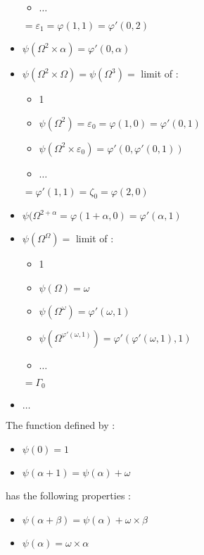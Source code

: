 \documentclass[10pt]{article}
\begin{document}
\begin{itemize}
\begin{itemize}
   \item \( \ldots \)
   \end{itemize}
   \( = \varepsilon_1 = \varphi(1,1) = \varphi'(0,2) \)
\item \( \psi(\Omega^2 \times \alpha) = \varphi'(0,\alpha) \)
\item \( \psi(\Omega^2 \times \Omega) = \psi(\Omega^3) = \) limit of :
   \begin{itemize}
     \setlength{\itemsep}{1pt}
     \setlength{\parskip}{0pt}
     \setlength{\parsep}{0pt}
   \item 1
   \item \( \psi(\Omega^2) = \varepsilon_0 = \varphi(1,0) = \varphi'(0,1) \)
   \item \( \psi(\Omega^2 \times \varepsilon_0) = \varphi'(0,\varphi'(0,1)) \)
   \item \( \ldots \)
   \end{itemize}
   \( = \varphi'(1,1) = \zeta_0 = \varphi(2,0) \)
\item \( \psi(\Omega^{2+\alpha} = \varphi(1+\alpha,0) = \varphi'(\alpha,1) \)
\item \( \psi(\Omega^\Omega) = \) limit of : 
   \begin{itemize}
     \setlength{\itemsep}{1pt}
     \setlength{\parskip}{0pt}
     \setlength{\parsep}{0pt}
   \item 1
   \item \( \psi(\Omega) = \omega \)
   \item \( \psi(\Omega^\omega) = \varphi'(\omega,1) \)
   \item \( \psi(\Omega^{\varphi'(\omega,1)}) = \varphi'(\varphi'(\omega,1),1) \)
   \item \( \ldots \)
   \end{itemize} 
   \( = \Gamma_0 \)
\item \( \ldots \)
\end{itemize}

\bigskip

The function defined by :

\begin{itemize}
     \setlength{\itemsep}{1pt}
     \setlength{\parskip}{0pt}
     \setlength{\parsep}{0pt}
\item \( \psi(0) = 1 \)
\item \( \psi(\alpha+1) = \psi(\alpha)+\omega \)
\end{itemize}

has the following properties :

\begin{itemize}
     \setlength{\itemsep}{1pt}
     \setlength{\parskip}{0pt}
     \setlength{\parsep}{0pt}
\item \( \psi(\alpha+\beta)=\psi(\alpha)+\omega \times \beta \)
\item \( \psi(\alpha) = \omega \times \alpha \)
\end{itemize}
\end{document}
